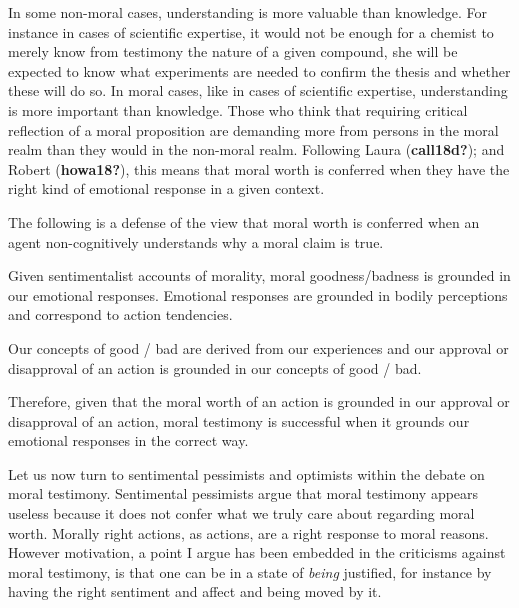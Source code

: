 \documentclass[12pt]{book}
\theoremstyle{definition}
\theoremstyle{remark}
\newcommand{\NormalTok}[1]{#1}
\newenvironment{Shaded}{}{}
\newenvironment{Highlighting}{}{}
\begin{document}
In some non-moral cases, understanding is more valuable than knowledge. For instance in cases of scientific expertise, it would not be enough for a chemist to merely know from testimony the nature of a given compound, she will be expected to know what experiments are needed to confirm the thesis and whether these will do so. In moral cases, like in cases of scientific expertise, understanding is more important than knowledge. Those who think that requiring critical reflection of a moral proposition are demanding more from persons in the moral realm than they would in the non-moral realm. Following Laura (\textbf{call18d?}); and Robert (\textbf{howa18?}), this means that moral worth is conferred when they have the right kind of emotional response in a given context.

The following is a defense of the view that moral worth is conferred when an agent non-cognitively understands why a moral claim is true.

\begin{Shaded}
\begin{Highlighting}[]

\NormalTok{Given sentimentalist accounts of morality, moral goodness/badness is grounded in our emotional responses. Emotional responses are grounded in bodily perceptions and correspond to action tendencies.}
\end{Highlighting}
\end{Shaded}

\begin{Shaded}
\begin{Highlighting}[]

\NormalTok{Our concepts of good / bad are derived from our experiences and our approval or disapproval of an action is grounded in our concepts of good / bad.}
\end{Highlighting}
\end{Shaded}

\begin{Shaded}
\begin{Highlighting}[]

\NormalTok{Therefore, given that the moral worth of an action is grounded in our approval or disapproval of an action, moral testimony is successful when it grounds our emotional responses in the correct way.}
\end{Highlighting}
\end{Shaded}

Let us now turn to sentimental pessimists and optimists within the debate on moral testimony. Sentimental pessimists argue that moral testimony appears useless because it does not confer what we truly care about regarding moral worth. Morally right actions, as actions, are a right response to moral reasons. However motivation, a point I argue has been embedded in the criticisms against moral testimony, is that one can be in a state of \emph{being} justified, for instance by having the right sentiment and affect and being moved by it.
\end{document}
